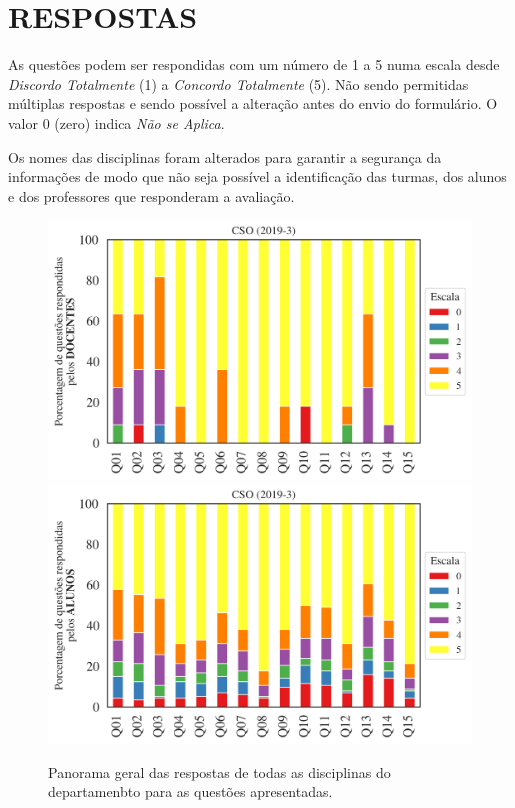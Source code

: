 \documentclass[a4paper,10pt]{article}
\begin{document}
\section{RESPOSTAS}
As questões podem ser respondidas com um número de 1 a 5 numa escala desde {\it Discordo Totalmente} (1) a {\it Concordo Totalmente} (5). Não sendo permitidas múltiplas respostas e sendo possível a alteração antes do envio do formulário. O valor 0 (zero) indica {\it Não se Aplica}.

Os nomes das disciplinas foram alterados para garantir a segurança da informações de modo que não seja possível a identificação das turmas, dos alunos  e dos professores que responderam a avaliação.

\begin{figure}[h]
\centering
\includegraphics[width=0.85\linewidth]{analise_geral_departamento_CSO_docentes.png}
\includegraphics[width=0.85\linewidth]{analise_geral_departamento_CSO_alunos.png}
\caption{\label{fig:analise_geral_departamento}            Panorama geral das respostas de todas as  disciplinas do departamenbto para as questões apresentadas.}
\end{figure}
\end{document}

